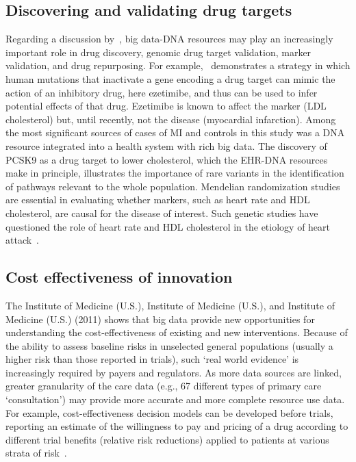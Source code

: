 \subsection{Discovering and validating drug targets}

Regarding a discussion by~\cite{rajkumar2010diagnosis}, big data-DNA
resources may play an increasingly important role in drug discovery,
genomic drug target validation, marker validation, and drug
repurposing. For example,~\cite{rajkumar2010diagnosis} demonstrates a
strategy in which human mutations that inactivate a gene encoding a
drug target can mimic the action of an inhibitory drug, here
ezetimibe, and thus can be used to infer potential effects of that
drug. Ezetimibe is known to affect the marker (LDL cholesterol) but,
until recently, not the disease (myocardial infarction). Among the
most significant sources of cases of MI and controls in this study was
a DNA resource integrated into a health system with rich big data. The
discovery of PCSK9 as a drug target to lower cholesterol, which the
EHR-DNA resources make in principle, illustrates the importance of
rare variants in the identification of pathways relevant to the whole
population. Mendelian randomization studies are essential in
evaluating whether markers, such as heart rate and HDL cholesterol,
are causal for the disease of interest. Such genetic studies have
questioned the role of heart rate and HDL cholesterol in the etiology
of heart attack~\cite{Wijeysunderae000731}.

\subsection{Cost effectiveness of innovation}

The Institute of Medicine (U.S.), Institute of Medicine (U.S.), and
Institute of Medicine (U.S.) (2011) shows that big data provide new
opportunities for understanding the cost-effectiveness of existing and
new interventions. Because of the ability to assess baseline risks in
unselected general populations (usually a higher risk than those
reported in trials), such `real world evidence' is increasingly
required by payers and regulators. As more data sources are linked,
greater granularity of the care data (e.g., 67 different types of
primary care `consultation') may provide more accurate and more
complete resource use data. For example, cost-effectiveness decision
models can be developed before trials, reporting an estimate of the
willingness to pay and pricing of a drug according to different trial
benefits (relative risk reductions) applied to patients at various
strata of risk~\cite{breiman2001random}.


